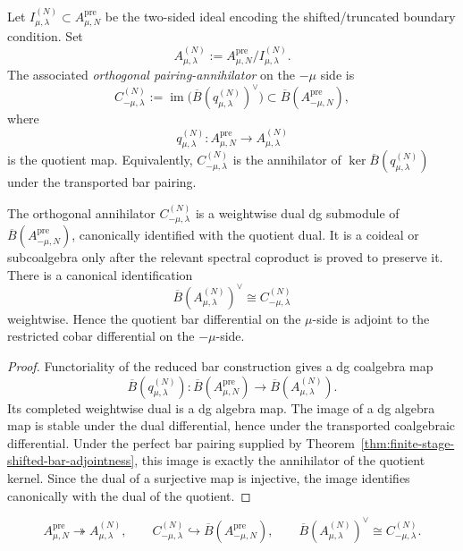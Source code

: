 \begin{definition}
\label{def:boundary-quotient-orthogonal-coideal}
Let $I_{\mu,\lambda}^{(N)}\subset A_{\mu,N}^{\mathrm{pre}}$ be the two-sided ideal
encoding the shifted/truncated boundary condition. Set
\[
A_{\mu,\lambda}^{(N)}:=A_{\mu,N}^{\mathrm{pre}}/I_{\mu,\lambda}^{(N)}.
\]
The associated \emph{orthogonal pairing-annihilator} on the $-\mu$ side is
\[
C_{-\mu,\lambda}^{(N)}
:=
\operatorname{im}\bigl(\overline{B}(q_{\mu,\lambda}^{(N)})^\vee\bigr)
\subset \overline{B}(A_{-\mu,N}^{\mathrm{pre}}),
\]
where
\[
q_{\mu,\lambda}^{(N)}\colon A_{\mu,N}^{\mathrm{pre}}\to A_{\mu,\lambda}^{(N)}
\]
is the quotient map. Equivalently, $C_{-\mu,\lambda}^{(N)}$ is the annihilator of
$\ker \overline{B}(q_{\mu,\lambda}^{(N)})$ under the transported bar pairing.
\end{definition}

\begin{theorem}
\label{thm:quotient-coideal-descent}
The orthogonal annihilator $C_{-\mu,\lambda}^{(N)}$ is a weightwise
dual dg submodule of
\(\overline{B}(A_{-\mu,N}^{\mathrm{pre}})\), canonically identified
with the quotient dual. It is a coideal or subcoalgebra only after
the relevant spectral coproduct is proved to preserve it. There is a
canonical
identification
\[
\overline{B}(A_{\mu,\lambda}^{(N)})^\vee\cong C_{-\mu,\lambda}^{(N)}
\]
weightwise. Hence the quotient bar differential on the $\mu$-side is adjoint to
the restricted cobar differential on the $-\mu$-side.
\end{theorem}

\begin{proof}
Functoriality of the reduced bar construction gives a dg coalgebra map
\[
\overline{B}(q_{\mu,\lambda}^{(N)})\colon
\overline{B}(A_{\mu,N}^{\mathrm{pre}})\to \overline{B}(A_{\mu,\lambda}^{(N)}).
\]
Its completed weightwise dual is a dg algebra map. The image of a dg algebra
map is stable under the dual differential, hence under the transported
coalgebraic differential. Under the perfect bar pairing supplied by
Theorem~\ref{thm:finite-stage-shifted-bar-adjointness}, this image is exactly the
annihilator of the quotient kernel. Since the dual of a surjective map is
injective, the image identifies canonically with the dual of the quotient.
\end{proof}

\[
A_{\mu,N}^{\mathrm{pre}}\twoheadrightarrow A_{\mu,\lambda}^{(N)},
\qquad
C_{-\mu,\lambda}^{(N)}\hookrightarrow \overline{B}(A_{-\mu,N}^{\mathrm{pre}}),
\qquad
\overline{B}(A_{\mu,\lambda}^{(N)})^\vee\cong C_{-\mu,\lambda}^{(N)}.
\]

